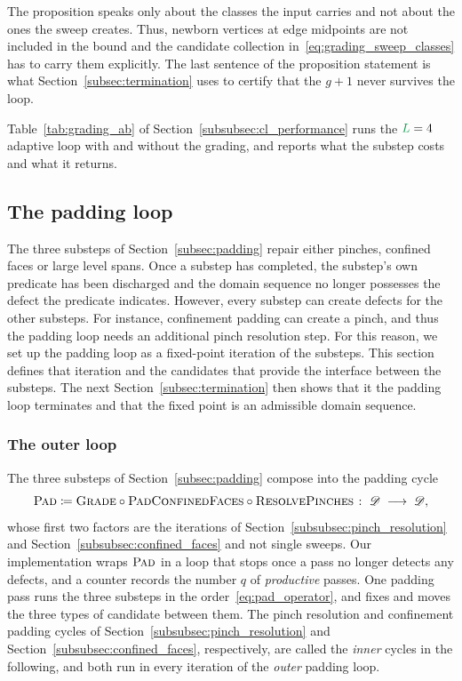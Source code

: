 \documentclass[a4paper, 12pt]{article}
\newcommand{\robert}[1]{{\color{orange} #1}}
\newcommand{\green}{\color{ForestGreen}}
\renewcommand{\L}{{\green L}}
\theoremstyle{definition}
\theoremstyle{plain}
\numberwithin{equation}{section}
\newcommand{\tobecut}[1]{{\color{red} #1}}     %
\newcommand{\alldomseqs}{\mathscr{D}}
\begin{document}
The proposition speaks only about the classes the input carries and not about the ones the sweep creates. Thus, newborn vertices at edge midpoints are not included in the bound and the candidate collection in~\eqref{eq:grading_sweep_classes} has to carry them explicitly. The last sentence of the proposition statement is what Section~\ref{subsec:termination} uses to certify that the $g \! + \! 1$ never survives the loop.

\robert{Table~\ref{tab:grading_ab} of Section~\ref{subsubsec:cl_performance} runs the $\L = 4$ adaptive loop with and without the grading, and reports what the substep costs and what it returns.}

\FloatBarrier

\subsection{The padding loop}
\label{subsec:padding_loop}

The three substeps of Section~\ref{subsec:padding} repair either pinches, confined faces or large level spans. Once a substep has completed, the substep's own predicate has been discharged and the domain sequence no longer possesses the defect the predicate indicates. However, every substep can create defects for the other substeps. For instance, confinement padding can create a pinch, and thus the padding loop needs an additional pinch resolution step. For this reason, we set up the padding loop as a fixed-point iteration of the substeps. This section defines that iteration and the candidates that provide the interface between the substeps. The next Section~\ref{subsec:termination} then shows that \tobecut{it} the padding loop terminates and that the fixed point is an admissible domain sequence.

\subsubsection{The outer loop}
\label{subsec:outer_loop}

The three substeps of Section~\ref{subsec:padding} compose into the padding cycle
\begin{equation}
    \label{eq:pad_operator}
    \textsc{Pad} \coloneq \textsc{Grade} \circ \textsc{PadConfinedFaces} \circ \textsc{ResolvePinches}
    \; \colon \; \alldomseqs \; \longrightarrow \; \alldomseqs,
\end{equation}
whose first two factors are the iterations of Section~\ref{subsubsec:pinch_resolution} and Section~\ref{subsubsec:confined_faces} and not single sweeps. Our implementation wraps $\textsc{Pad}$ in a loop that stops once a pass no longer detects any defects, and a counter records the number $q$ of \emph{productive} passes. One padding pass runs the three substeps in the order~\eqref{eq:pad_operator}, and fixes and moves the three types of candidate between them. The pinch resolution and confinement padding cycles of Section~\ref{subsubsec:pinch_resolution} and Section~\ref{subsubsec:confined_faces}, respectively, are called the \emph{inner} cycles in the following, and both run in every iteration of the \emph{outer} padding loop.
\end{document}
